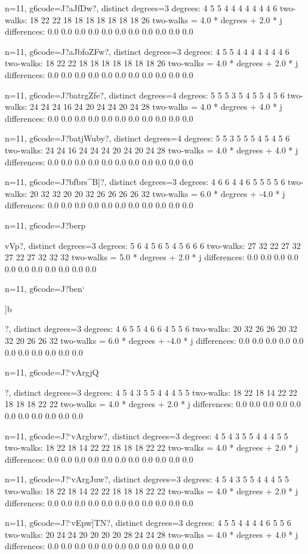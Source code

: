 {{{{{{{{{{{{{{{n=11, g6code=J?aJfDw\Fw?, distinct degrees=3
degrees: 4 5 5 4 4 4 4 4 4 4 6 
two-walks: 18 22 22 18 18 18 18 18 18 18 26 
two-walks = 4.0 * degrees + 2.0 * j
differences: 0.0 0.0 0.0 0.0 0.0 0.0 0.0 0.0 0.0 0.0 0.0 

n=11, g6code=J?aJbfoZFw?, distinct degrees=3
degrees: 4 5 5 4 4 4 4 4 4 4 6 
two-walks: 18 22 22 18 18 18 18 18 18 18 26 
two-walks = 4.0 * degrees + 2.0 * j
differences: 0.0 0.0 0.0 0.0 0.0 0.0 0.0 0.0 0.0 0.0 0.0 

n=11, g6code=J?batrgZfe?, distinct degrees=4
degrees: 5 5 5 3 5 4 5 5 4 5 6 
two-walks: 24 24 24 16 24 20 24 24 20 24 28 
two-walks = 4.0 * degrees + 4.0 * j
differences: 0.0 0.0 0.0 0.0 0.0 0.0 0.0 0.0 0.0 0.0 0.0 

n=11, g6code=J?batjWuby?, distinct degrees=4
degrees: 5 5 3 5 5 5 4 5 4 5 6 
two-walks: 24 24 16 24 24 24 20 24 20 24 28 
two-walks = 4.0 * degrees + 4.0 * j
differences: 0.0 0.0 0.0 0.0 0.0 0.0 0.0 0.0 0.0 0.0 0.0 

n=11, g6code=J?bfbrs^B]?, distinct degrees=3
degrees: 4 6 6 4 4 6 5 5 5 5 6 
two-walks: 20 32 32 20 20 32 26 26 26 26 32 
two-walks = 6.0 * degrees + -4.0 * j
differences: 0.0 0.0 0.0 0.0 0.0 0.0 0.0 0.0 0.0 0.0 0.0 

n=11, g6code=J?berp{vVp?, distinct degrees=3
degrees: 5 6 4 5 6 5 4 5 6 6 6 
two-walks: 27 32 22 27 32 27 22 27 32 32 32 
two-walks = 5.0 * degrees + 2.0 * j
differences: 0.0 0.0 0.0 0.0 0.0 0.0 0.0 0.0 0.0 0.0 0.0 

n=11, g6code=J?ben`{]b{?, distinct degrees=3
degrees: 4 6 5 5 4 6 6 4 5 5 6 
two-walks: 20 32 26 26 20 32 32 20 26 26 32 
two-walks = 6.0 * degrees + -4.0 * j
differences: 0.0 0.0 0.0 0.0 0.0 0.0 0.0 0.0 0.0 0.0 0.0 

n=11, g6code=J?`vArgjQ{?, distinct degrees=3
degrees: 4 5 4 3 5 5 4 4 4 5 5 
two-walks: 18 22 18 14 22 22 18 18 18 22 22 
two-walks = 4.0 * degrees + 2.0 * j
differences: 0.0 0.0 0.0 0.0 0.0 0.0 0.0 0.0 0.0 0.0 0.0 

n=11, g6code=J?`vArgbrw?, distinct degrees=3
degrees: 4 5 4 3 5 5 4 4 4 5 5 
two-walks: 18 22 18 14 22 22 18 18 18 22 22 
two-walks = 4.0 * degrees + 2.0 * j
differences: 0.0 0.0 0.0 0.0 0.0 0.0 0.0 0.0 0.0 0.0 0.0 

n=11, g6code=J?`vArgJuw?, distinct degrees=3
degrees: 4 5 4 3 5 5 4 4 4 5 5 
two-walks: 18 22 18 14 22 22 18 18 18 22 22 
two-walks = 4.0 * degrees + 2.0 * j
differences: 0.0 0.0 0.0 0.0 0.0 0.0 0.0 0.0 0.0 0.0 0.0 

n=11, g6code=J?`vEpw]TN?, distinct degrees=3
degrees: 4 5 5 4 4 4 4 6 5 5 6 
two-walks: 20 24 24 20 20 20 20 28 24 24 28 
two-walks = 4.0 * degrees + 4.0 * j
differences: 0.0 0.0 0.0 0.0 0.0 0.0 0.0 0.0 0.0 0.0 0.0 

}}}}}}}}}}}}}}}}}}}
